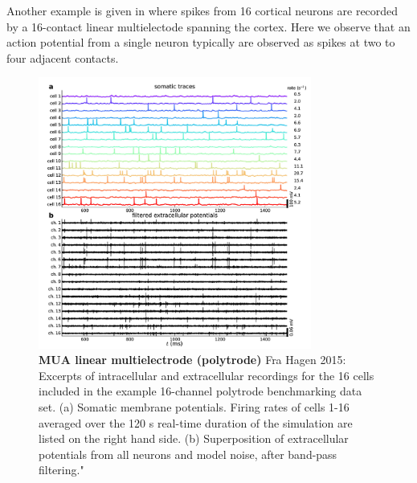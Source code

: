 Another example is given in  where spikes from 16 cortical neurons are recorded by a 16-contact linear multielectode spanning the cortex. Here we observe that an action potential from a single neuron typically are observed as spikes at two to four adjacent contacts.



\begin{figure}[!ht]
\begin{center}
\includegraphics[width=0.8\textwidth]{Figures/Spikes/MUA-10}
\end{center}
\caption[]{\textbf{MUA linear multielectrode (polytrode)}
Fra Hagen 2015: Excerpts of intracellular and extracellular recordings for the 16 cells included in the example 16-channel polytrode benchmarking data set. 
(a) Somatic membrane potentials. Firing rates of cells 1-16 averaged over the 120 s real-time duration of the simulation are listed on the right hand side. (b) Superposition of extracellular potentials from all neurons and model noise, after band-pass filtering."
}
\label{fig:Spikes:MUA-polytrode}
\end{figure}

\subsection{}  

